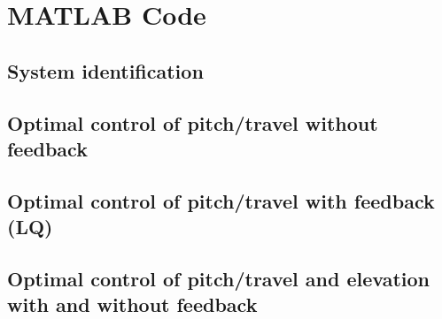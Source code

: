 \section{MATLAB Code}\label{text:matlab}

\subsection{System identification}\label{code:sys_id}


\subsection{Optimal control of pitch/travel without feedback}\label{code:sys_id}


\subsection{Optimal control of pitch/travel with feedback (LQ)}\label{code:sys_id}


\subsection{Optimal control of pitch/travel and elevation with and without feedback}\label{code:sys_id}

